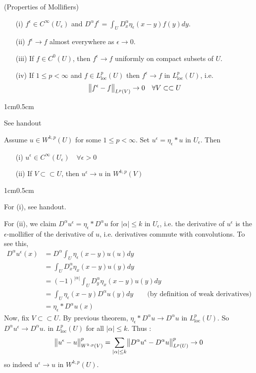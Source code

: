 \documentclass[12pt,a4paper]{report}
\newenvironment{proof}
{\begin{changemargin}{1cm}{0.5cm} 
	}%
	{\end{changemargin}
}
\begin{document}
\thm (Properties of Mollifiers) \begin{itemize}
\item[(i)] $f^{\epsilon} \in C^{\infty}(U_{\epsilon})$ and $D^{\alpha}f^{\epsilon} = \int_U D^{\alpha}_x \eta_{\epsilon}(x-y)f(y) dy$.
\item[(ii)] $f^{\epsilon}\rightarrow f$ almost everywhere as $\epsilon \rightarrow 0$.
\item[(iii)] If $f\in C^0 (U)$, then $f^{\epsilon} \rightarrow f$ uniformly on compact subsets of $U$.
\item[(iv)] If $1\leq p <\infty$ and $f \in L^p_{\text{loc}}(U)$ then $f^{\epsilon} \rightarrow f$ in $L^p_{\text{loc}}(U)$, i.e.
\begin{align*}
\bigl\lVert f^{\epsilon} - f\bigr\rVert_{L^p(V)} \rightarrow 0 \quad \forall V \subset\subset U
\end{align*}
\end{itemize}
\begin{proof}
\pf See handout
\end{proof}

\s

\lem Assume $u \in W^{k,p}(U)$ for some $1\leq p < \infty$. Set $u^{\epsilon} = \eta_{\epsilon} * u$ in $U_{\epsilon}$. Then
\begin{itemize}
\item[(i)] $u^{\epsilon} \in C^{\infty}(U_{\epsilon}) \quad \forall \epsilon >0$
\item[(ii)] If $V \subset \subset U$, then $u^{\epsilon} \rightarrow u$ in $W^{k,p}(V)$
\end{itemize}
\begin{proof}
\pf For (i), see handout.

For (ii), we claim $D^{\alpha} u^{\epsilon} = \eta_{\epsilon} * D^{\alpha} u$ for $|\alpha| \leq k$ in $U_{\epsilon}$, i.e. the derivative of $u^{\epsilon}$ is the $\epsilon$-mollifier of the derivative of $u$, i.e. derivatives commute with convolutions. To see this,
\begin{align*}
D^{\alpha} u^{\epsilon}(x) &= D^{\alpha} \int_U \eta_{\epsilon}(x-y) u(u) dy \\
&= \int_U D_x^{\alpha} \eta_x(x-y) u(y) dy \\
&= (-1)^{|\alpha|} \int_U D_y^{\alpha} \eta_x(x-y) u(y) dy \\
&= \int_U \eta_{\epsilon}(x-y) D^{\alpha} u(y) dy \quad \quad \text{(by definition of weak derivatives)} \\
&= \eta_{\epsilon} * D^{\alpha} u(x)
\end{align*}
Now, fix $V\subset \subset U$. By previous theorem, $\eta_{\epsilon} * D^{\alpha} u \rightarrow D^{\alpha} u$ in $L^p_{\text{loc}}(U)$. So $D^{\alpha} u^{\epsilon} \rightarrow D^{\alpha} u$. in $L^p_{\text{loc}}(U)$ for all $|\alpha| \leq k$. Thus :
\begin{align*}
\bigl\lVert u^{\epsilon}- u\bigr\rVert_{W^{k,p}(V)}^p = \sum_{|\alpha|\leq k} \bigl\lVert D^{\alpha} u^{\epsilon} - D^{\alpha}u\bigr\rVert_{L^p(U)}^p \rightarrow 0
\end{align*}
so indeed $u^{\epsilon} \rightarrow u$ in $W^{k,p}(U)$.

\eop
\end{proof}
\s
\end{document}
